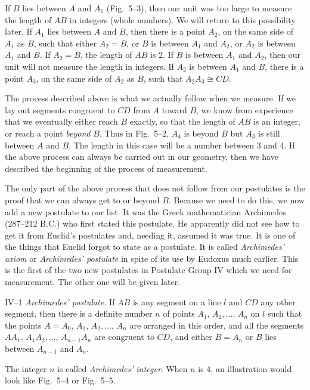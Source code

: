 \documentclass[11pt]{book}
\theoremstyle{bkplain}
\theoremstyle{XIplainnote}
\theoremstyle{bkplain}
\theoremstyle{bkplain}
\begin{document}
\FIGVTWO

\FIGVTHREE

\noindent If $B$ lies between $A$ and $A_1$ (Fig.~5--3), then our unit was too
large to measure the length of $AB$ in integers (whole numbers). We will return
to this possibility later. If $A_1$ lies between $A$ and $B$, then there is a
point $A_2$, on the same side of $A_1$ as $B$, such that either $A_2 = B$, or
$B$ is between $A_1$ and $A_2$, or $A_2$ is between $A_1$ and $B$. If
$A_2 = B$, the length of $AB$ is 2. If $B$ is between $A_1$ and $A_2$, then our
unit will not measure the length in integers. If $A_2$ is between $A_1$ and
$B$, there is a point $A_3$, on the same side of $A_2$ as $B$, such that
$A_2A_3 \cong CD$.

The process described above is what we actually follow when we measure. If we
lay out segments congruent to $CD$ from $A$ toward $B$, we know from experience
that we eventually either reach $B$ exactly, so that the length of $AB$ is an
integer, or reach a point \emph{beyond} $B$. Thus in Fig.~5--2, $A_4$ is beyond
$B$ but $A_3$ is still between $A$ and $B$. The length in this case will be a
number between 3 and 4. If the above process can always be carried out in our
geometry, then we have described the beginning of the process of measurement.

The only part of the above process that does not follow from our postulates is
the proof that we can always get to or beyond $B$. Because we need to do this,
we now add a new postulate to our list. It was the Greek mathematician
Archimedes (287--212 B.C.) who first stated this postulate. He apparently did
not see how to get it from Euclid's postulates and, needing it, assumed it was
true. It is one of the things that Euclid forgot to state as a postulate. It is
called \emph{Archimedes' axiom} or \emph{Archimedes' postulate} in spite of its
use by Eudoxus much earlier. This is the first of the two new postulates in
Postulate Group IV which we need for measurement. The other one will be given
later.

\medskip
IV--1 \emph{Archimedes' postulate.} If $AB$ is any segment on a line $l$ and
$CD$ any other segment, then there is a definite number $n$ of points
$A_1$, $A_2,\ldots$, $A_n$ on $l$ such that the points $A = A_0$, $A_1$,
$A_2,\ldots$, $A_n$ are arranged in this order, and all the segments $AA_1$,
$A_1A_2,\ldots$, $A_{n-1}A_n$ are congruent to $CD$, and either $B = A_n$ or
$B$ lies between $A_{n-1}$ and $A_n$.

\medskip
The integer $n$ is called \emph{Archimedes' integer}. When $n$ is 4, an
illustration would look like Fig.~5--4 or Fig.~5--5.
\end{document}

